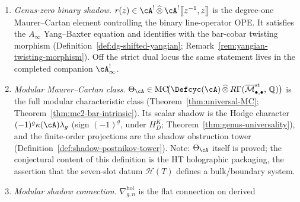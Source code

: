 \begin{definition}
\begin{enumerate}[label=\textup{(\roman*)}]
 may take
 $\mathcal{C} = \mathcal{C}^{\bullet}_{\mathrm{ch}}(\cA,\cA)
 \simeq \cZ^{\mathrm{der}}_{\mathrm{ch}}(\cA)$
 by the chiral Swiss-cheese theorem
 \textup{(}Theorem~\ref{thm:thqg-swiss-cheese}\textup{)}. On the
 chirally Koszul line side, when a compact-generator comparison is
 available, the same slot is presented by the dg-category of line
 operators
 $\mathcal{C}_{\mathrm{line}} \simeq
 \cA^!_{\mathrm{line}}\text{-}\mathsf{mod}$
 \textup{(}Vol~II, theorem ``Lines as Modules for the Open-Colour
 Dual''\textup{)}. The
 global identification of these two presentations is precisely the
 global-triangle problem. The categorical annulus trace and a physical
 bulk, when present, enter through typed maps
 \[
 \mathrm{Tr}_{\mathcal C_{\mathrm{line}}}
 \longrightarrow
 \mathcal{C}^{\bullet}_{\mathrm{ch}}(\cA,\cA)
 \simeq
 \cZ^{\mathrm{der}}_{\mathrm{ch}}(\cA),
 \qquad
 \mathfrak{Bulk}(T)|_X
 \longrightarrow
 \cZ^{\mathrm{der}}_{\mathrm{ch}}(\cA).
 \]
 These maps are not automatic equivalences. The base curve~$X$ is
 ambient data and is not counted as a slot of~$\mathcal{H}(T)$.
\item \emph{Genus-zero binary shadow.}
 $r(z) \in \cA^! \,\widehat{\otimes}\, \cA^!\bigl[\![z^{-1},z]\!\bigr]$
 is the degree-one Maurer--Cartan element controlling the binary
 line-operator OPE. It satisfies the $A_\infty$ Yang--Baxter equation
 and identifies with the bar-cobar twisting morphism
 (Definition~\ref{def:dg-shifted-yangian};
 Remark~\ref{rem:yangian-twisting-morphism}). Off the strict dual
 locus the same statement lives in the completed companion
 $\cA^{!}_\infty$.
\item \emph{Modular Maurer--Cartan class.}
 $\Theta_\cA \in
 \mathrm{MC}\!\bigl(\Defcyc(\cA) \,\widehat{\otimes}\,
 R\Gamma(\overline{\mathcal{M}}_{\bullet,\bullet}^{\mathrm{st}},\,
 \mathbb{Q})\bigr)$
 is the full modular characteristic class
 (Theorem~\ref{thm:universal-MC};
 Theorem~\ref{thm:mc2-bar-intrinsic}). Its scalar shadow is the
 Hodge character
 $(-1)^g\kappa(\cA)\lambda_g$ \textup{(}sign $(-1)^g$, under
 $H_D^K$; Theorem~\ref{thm:genus-universality}\textup{)},
 and the finite-order projections are the shadow obstruction tower
 (Definition~\ref{def:shadow-postnikov-tower}).
 Note: $\Theta_\cA$ itself is proved; the conjectural content of
 this definition is the HT holographic packaging, the assertion
 that the seven-slot datum $\mathcal{H}(T)$ defines a bulk/boundary
 system.
\item \emph{Modular shadow connection.}
 $\nabla^{\mathrm{hol}}_{g,n}$ is the flat connection on derived

\end{enumerate}
\end{definition}
